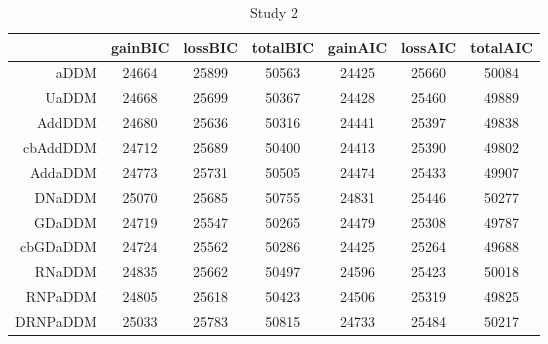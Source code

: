 \begin{table}[ht]
\centering
\begin{tabular}{|r|ccc|ccc|}
  \hline
 & gainBIC & lossBIC & totalBIC & gainAIC & lossAIC & totalAIC \\ 
  \hline
aDDM & 24664 & 25899 & 50563 & 24425 & 25660 & 50084 \\ 
  UaDDM & 24668 & 25699 & 50367 & 24428 & 25460 & 49889 \\ 
  AddDDM & 24680 & 25636 & 50316 & 24441 & 25397 & 49838 \\ 
  cbAddDDM & 24712 & 25689 & 50400 & 24413 & 25390 & 49802 \\ 
  AddaDDM & 24773 & 25731 & 50505 & 24474 & 25433 & 49907 \\ 
  DNaDDM & 25070 & 25685 & 50755 & 24831 & 25446 & 50277 \\ 
  GDaDDM & 24719 & 25547 & 50265 & 24479 & 25308 & 49787 \\ 
  cbGDaDDM & 24724 & 25562 & 50286 & 24425 & 25264 & 49688 \\ 
  RNaDDM & 24835 & 25662 & 50497 & 24596 & 25423 & 50018 \\ 
  RNPaDDM & 24805 & 25618 & 50423 & 24506 & 25319 & 49825 \\ 
  DRNPaDDM & 25033 & 25783 & 50815 & 24733 & 25484 & 50217 \\ 
   \hline
\end{tabular}
\caption{Study 2} 
\end{table}
